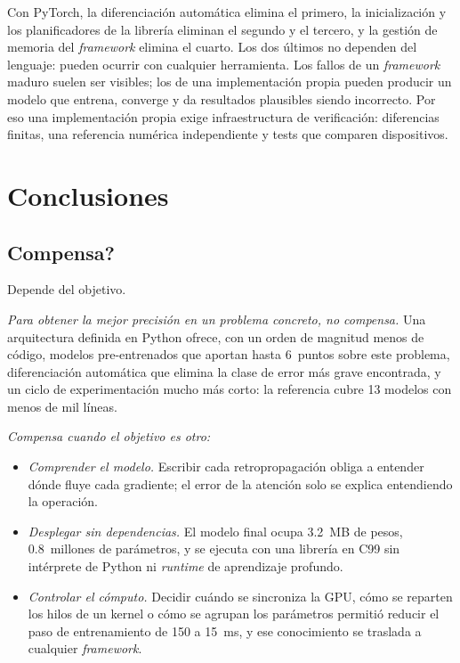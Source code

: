 \documentclass[11pt,a4paper]{article}
\begin{document}
Con PyTorch, la diferenciación automática elimina el primero, la inicialización
y los planificadores de la librería eliminan el segundo y el tercero, y la
gestión de memoria del \emph{framework} elimina el cuarto. Los dos últimos no
dependen del lenguaje: pueden ocurrir con cualquier herramienta. Los fallos de un
\emph{framework} maduro suelen ser visibles; los de una implementación propia
pueden producir un modelo que entrena, converge y da resultados plausibles
siendo incorrecto. Por eso una implementación propia exige infraestructura de
verificación: diferencias finitas, una referencia numérica independiente y tests
que comparen dispositivos.

\section{Conclusiones}

\subsection{\textquestiondown{}Compensa?}

Depende del objetivo.

\emph{Para obtener la mejor precisión en un problema concreto, no compensa.}
Una arquitectura definida en Python ofrece, con un orden de magnitud menos de
código, modelos pre-entrenados que aportan hasta 6~puntos sobre este problema,
diferenciación automática que elimina la clase de error más grave encontrada, y
un ciclo de experimentación mucho más corto: la referencia cubre 13 modelos con
menos de mil líneas.

\emph{Compensa cuando el objetivo es otro:}

\begin{itemize}
  \item \emph{Comprender el modelo.} Escribir cada retropropagación obliga a
        entender dónde fluye cada gradiente; el error de la atención solo se
        explica entendiendo la operación.
  \item \emph{Desplegar sin dependencias.} El modelo final ocupa 3.2~MB de
        pesos, 0.8~millones de parámetros, y se ejecuta con una librería en
        C99 sin intérprete de Python ni \emph{runtime} de aprendizaje profundo.
  \item \emph{Controlar el cómputo.} Decidir cuándo se sincroniza la GPU, cómo
        se reparten los hilos de un kernel o cómo se agrupan los parámetros
        permitió reducir el paso de entrenamiento de 150 a 15~ms, y ese
        conocimiento se traslada a cualquier \emph{framework}.
\end{itemize}
\end{document}
